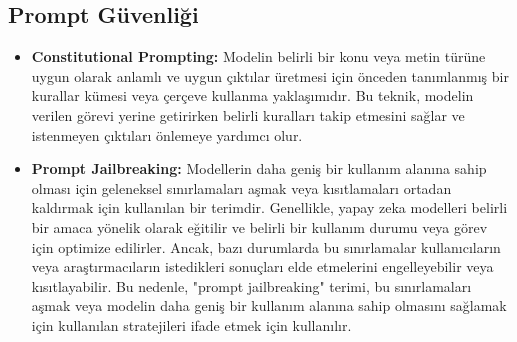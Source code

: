 \subsection{Prompt Güvenliği}
\begin{itemize}
    \item \textbf{Constitutional Prompting:} Modelin belirli bir konu veya metin türüne uygun olarak anlamlı ve uygun çıktılar üretmesi için önceden tanımlanmış bir kurallar kümesi veya çerçeve kullanma yaklaşımıdır. Bu teknik, modelin verilen görevi yerine getirirken belirli kuralları takip etmesini sağlar ve istenmeyen çıktıları önlemeye yardımcı olur.
    \item \textbf{Prompt Jailbreaking:} Modellerin daha geniş bir kullanım alanına sahip olması için geleneksel sınırlamaları aşmak veya kısıtlamaları ortadan kaldırmak için kullanılan bir terimdir. Genellikle, yapay zeka modelleri belirli bir amaca yönelik olarak eğitilir ve belirli bir kullanım durumu veya görev için optimize edilirler. Ancak, bazı durumlarda bu sınırlamalar kullanıcıların veya araştırmacıların istedikleri sonuçları elde etmelerini engelleyebilir veya kısıtlayabilir. Bu nedenle, "prompt jailbreaking" terimi, bu sınırlamaları aşmak veya modelin daha geniş bir kullanım alanına sahip olmasını sağlamak için kullanılan stratejileri ifade etmek için kullanılır.
\end{itemize}

\newpage
